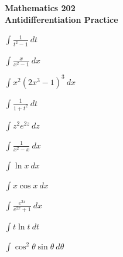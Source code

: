 \documentclass[12pt]{article}
\begin{document}


\noindent
{\bf Mathematics 202} \\ 
{\bf Antidifferentiation Practice}

\bigskip
$\displaystyle
\int\frac{1}{t^2 - 1}~dt 
$

\vspace{1.85in}

$\displaystyle
\int \frac{x}{x^2 - 1}~dx$

\vspace{1.85in}

$\displaystyle
\int x^2(2x^3 - 1)^3~dx 
$

\vspace{1.85in}

$\displaystyle
\int\frac1{1+t^2}~dt 
$

\vspace{2in}

$\displaystyle
\int z^2 e^{2z}~dz 
$

\vspace{2in}

$\displaystyle
\int \frac{1}{x^2-x}~dx$ 

\vspace{2in}

$\displaystyle
\int \ln x~dx 
$

\vspace{2in}

$\displaystyle
\int x\cos x~dx
$

\vspace{2in}

$\displaystyle
\int\frac{e^{2x}}{e^{2x} + 1}~dx
$

\vspace{2in}

$\displaystyle
\int t\ln t~dt 
$

\vspace{2in}

$\displaystyle
\int \cos^2\theta\sin\theta~d\theta
$
\end{document}
